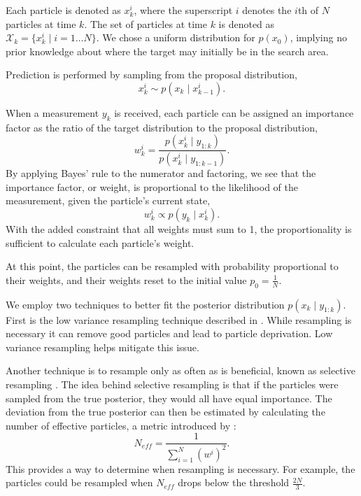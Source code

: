 \documentclass[letterpaper, 10 pt, conference]{ieeeconf}  %
\begin{document}
Each particle is denoted as $x^i_k$, where the superscript $i$ denotes the $i$th of $N$ particles at time $k$. The set of particles at time $k$ is denoted as $\mathcal{X}_k = \{x^i_k \mid i = 1 \ldots N\}$. We chose a uniform distribution for $p(x_0)$, implying no prior knowledge about where the target may initially be in the search area.

Prediction is performed by sampling from the proposal distribution,
\begin{equation}\label{eq:proposal_dist}
    x^i_k \sim p(x_k \mid x^i_{k-1}).
\end{equation}

When a measurement $y_k$ is received, each particle can be assigned an importance factor as the ratio of the target distribution to the proposal distribution,
\begin{equation}%
    w^i_k = \frac{p(x^i_k \mid y_{1:k})}{p(x^i_k \mid y_{1:k-1})}.
\end{equation}
By applying Bayes' rule to the numerator and factoring, we see that the importance factor, or weight, is proportional to the likelihood of the measurement, given the particle's current state,
\begin{equation}%
    w^i_k \propto p(y_k \mid x^i_k).
\end{equation}
With the added constraint that all weights must sum to 1, the proportionality is sufficient to calculate each particle's weight.

At this point, the particles can be resampled with probability proportional to their weights, and their weights reset to the initial value $p_0 = \frac{1}{N}$.

We employ two techniques to better fit the posterior distribution $p(x_k \mid y_{1:k})$. First is the low variance resampling technique described in \cite{Thrun2006}. While resampling is necessary it can remove good particles and lead to particle deprivation. Low variance resampling helps mitigate this issue.

Another technique is to resample only as often as is beneficial, known as selective resampling \cite{Grisetti2005}. The idea behind selective resampling is that if the particles were sampled from the true posterior, they would all have equal importance. The deviation from the true posterior can then be estimated by calculating the number of effective particles, a metric introduced by \cite{Liu1996}:
\begin{equation}%
N_{eff} = \frac{1}{\sum_{i=1}^N (w^i)^2}.
\end{equation}
This provides a way to determine when resampling is necessary. For example, the particles could be resampled when $N_{eff}$ drops below the threshold $\frac{2N}{3}$.
\end{document}
